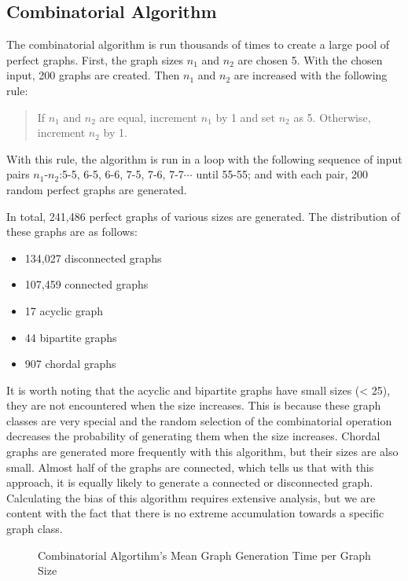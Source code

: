 \subsection{Combinatorial Algorithm}

The combinatorial algorithm is run thousands of times to create a large pool of perfect graphs. First, the graph sizes $n_1$ and $n_2$ are chosen 5. With the chosen input, 200 graphs are created. Then $n_1$ and $n_2$ are increased with the following rule:

\begin{quote}
If $n_1$ and $n_2$ are equal, increment $n_1$ by 1 and set $n_2$ as 5. Otherwise, increment $n_2$ by 1.
\end{quote}

With this rule, the algorithm is run in a loop with the following sequence of input pairs $n_1$-$n_2$:5-5, 6-5, 6-6, 7-5, 7-6, 7-7\hspace{1em}$\cdots$\hspace{1em} until 55-55; and with each pair, 200 random perfect graphs are generated.

In total, 241,486 perfect graphs of various sizes are generated. The distribution of these graphs are as follows:

\begin{itemize}
    \item 134,027 disconnected graphs
    \item 107,459 connected graphs
    \item 17 acyclic graph
    \item 44 bipartite graphs
    \item 907 chordal graphs
\end{itemize}

It is worth noting that the acyclic and bipartite graphs have small sizes (< 25), they are not encountered when the size increases. This is because these graph classes are very special and the random selection of the combinatorial operation decreases the probability of generating them when the size increases. Chordal graphs are generated more frequently with this algorithm, but their sizes are also small. Almost half of the graphs are connected, which tells us that with this approach, it is equally likely to generate a connected or disconnected graph. Calculating the bias of this algorithm requires extensive analysis, but we are content with the fact that there is no extreme accumulation towards a specific graph class.

\begin{figure}[H]
    \centering
    
    \caption{Combinatorial Algortihm's Mean Graph Generation Time per Graph Size}
    \label{fig:comb-alg-timePerSize}
\end{figure}

